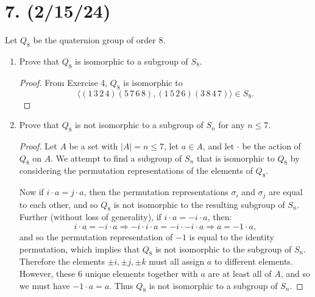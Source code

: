 \documentclass{article}
\begin{document}
\section*{7. (2/15/24)}

Let $Q_8$ be the quaternion group of order 8.

\begin{enumerate}[label=(\alph*), itemsep=0em]
    \item Prove that $Q_8$ is isomorphic to a subgroup of $S_8$.
        \begin{proof}
            From Exercise 4, $Q_8$ is isomorphic to
            \begin{equation*}
                \langle (1\,3\,2\,4)(5\,7\,6\,8), (1\,5\,2\,6)(3\,8\,4\,7) \rangle \in S_8.
            \end{equation*}
        \end{proof}
    \item Prove that $Q_8$ is not isomorphic to a subgroup of $S_n$ for any $n \leq 7$.
        \begin{proof}
            Let $A$ be a set with $|A| = n \leq 7$, let $a \in A$, and let $\cdot$ be the action of $Q_8$ on $A$. We attempt to find a subgroup of $S_n$ that is isomorphic to $Q_8$ by considering the permutation representations of the elements of $Q_8$.
            
            Now if $i \cdot a = j \cdot a$, then the permutation representations $\sigma_i$ and $\sigma_j$ are equal to each other, and so $Q_8$ is not isomorphic to the resulting subgroup of $S_n$. Further (without loss of generality), if $i \cdot a = -i \cdot a$, then:
            \begin{equation*}
                i \cdot a = -i \cdot a \Rightarrow -i \cdot i \cdot a = -i \cdot -i \cdot a \Rightarrow a = -1 \cdot a,
            \end{equation*}
            and so the permutation representation of $-1$ is equal to the identity permutation, which implies that $Q_8$ is not isomorphic to the subgroup of $S_n$. Therefore the elements $\pm i, \pm j, \pm k$ must all assign $a$ to different elements. However, these 6 unique elements together with $a$ are at least all of $A$, and so we must have $-1 \cdot a = a$. Thus $Q_8$ is not isomorphic to a subgroup of $S_n$.
        \end{proof}
\end{enumerate}
\end{document}
